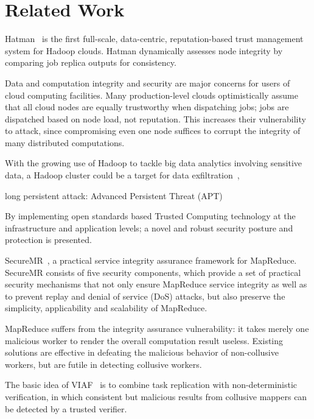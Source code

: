 \section{Related Work}
\label{sec:relwork}

\iffalse
Related Work (``somewhat related'' work goes here; directly related work
goes into the Introduction)~\cite{dsd13}.
\fi

Hatman~\cite{khan2012hatman} is the first full-scale, data-centric, reputation-based trust management system for Hadoop clouds. Hatman dynamically assesses node integrity by comparing job replica outputs for consistency.

Data and computation integrity and security are major concerns for users of cloud computing facilities. Many production-level clouds optimistically assume that all cloud nodes are equally trustworthy when dispatching jobs; jobs are dispatched based on node load, not reputation. This increases their vulnerability to attack, since compromising even one node suffices to corrupt the integrity of many distributed computations.




With the growing use of Hadoop to tackle big data analytics involving sensitive data, a Hadoop cluster could be a target for data exfiltration~\cite{cohen2012incorporating},

long persistent attack: Advanced Persistent Threat (APT)

By implementing open standards based Trusted Computing technology at the infrastructure and application levels; a novel and robust security posture and protection is presented. 



SecureMR~\cite{wei2009securemr}, a practical service integrity assurance framework for MapReduce. SecureMR consists of five security components, which provide a set of practical security mechanisms that not only ensure MapReduce service integrity as well as to prevent replay and denial of service (DoS) attacks, but also preserve the simplicity, applicability and scalability of MapReduce.



MapReduce suffers from the integrity assurance vulnerability: it takes merely one malicious worker to render the overall computation result useless. Existing solutions are effective in defeating the malicious behavior of non-collusive workers, but are futile in detecting collusive workers.

The basic idea of VIAF~\cite{wang2011viaf} is to combine task replication with non-deterministic verification, in which consistent but malicious results from collusive mappers can be detected by a trusted verifier.